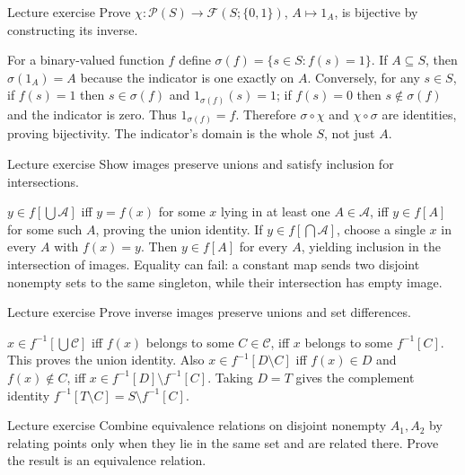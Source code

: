 \begin{exam}{Lecture exercise}
Prove $\chi:\mathcal P(S)\to\mathcal F(S;\{0,1\})$, $A\mapsto1_A$, is bijective by constructing its inverse.
\end{exam}
\begin{answer}
For a binary-valued function $f$ define $\sigma(f)=\{s\in S:f(s)=1\}$. If $A\subseteq S$, then $\sigma(1_A)=A$ because the indicator is one exactly on $A$. Conversely, for any $s\in S$, if $f(s)=1$ then $s\in\sigma(f)$ and $1_{\sigma(f)}(s)=1$; if $f(s)=0$ then $s\notin\sigma(f)$ and the indicator is zero. Thus $1_{\sigma(f)}=f$. Therefore $\sigma\circ\chi$ and $\chi\circ\sigma$ are identities, proving bijectivity. The indicator's domain is the whole $S$, not just $A$.
\end{answer}
\begin{exam}{Lecture exercise}
Show images preserve unions and satisfy inclusion for intersections.
\end{exam}
\begin{answer}
$y\in f[\bigcup\mathcal A]$ iff $y=f(x)$ for some $x$ lying in at least one $A\in\mathcal A$, iff $y\in f[A]$ for some such $A$, proving the union identity. If $y\in f[\bigcap\mathcal A]$, choose a single $x$ in every $A$ with $f(x)=y$. Then $y\in f[A]$ for every $A$, yielding inclusion in the intersection of images. Equality can fail: a constant map sends two disjoint nonempty sets to the same singleton, while their intersection has empty image.
\end{answer}
\begin{exam}{Lecture exercise}
Prove inverse images preserve unions and set differences.
\end{exam}
\begin{answer}
$x\in f^{-1}[\bigcup\mathcal C]$ iff $f(x)$ belongs to some $C\in\mathcal C$, iff $x$ belongs to some $f^{-1}[C]$. This proves the union identity. Also $x\in f^{-1}[D\setminus C]$ iff $f(x)\in D$ and $f(x)\notin C$, iff $x\in f^{-1}[D]\setminus f^{-1}[C]$. Taking $D=T$ gives the complement identity $f^{-1}[T\setminus C]=S\setminus f^{-1}[C]$.
\end{answer}
\begin{exam}{Lecture exercise}
Combine equivalence relations on disjoint nonempty $A_1,A_2$ by relating points only when they lie in the same set and are related there. Prove the result is an equivalence relation.
\end{exam}
